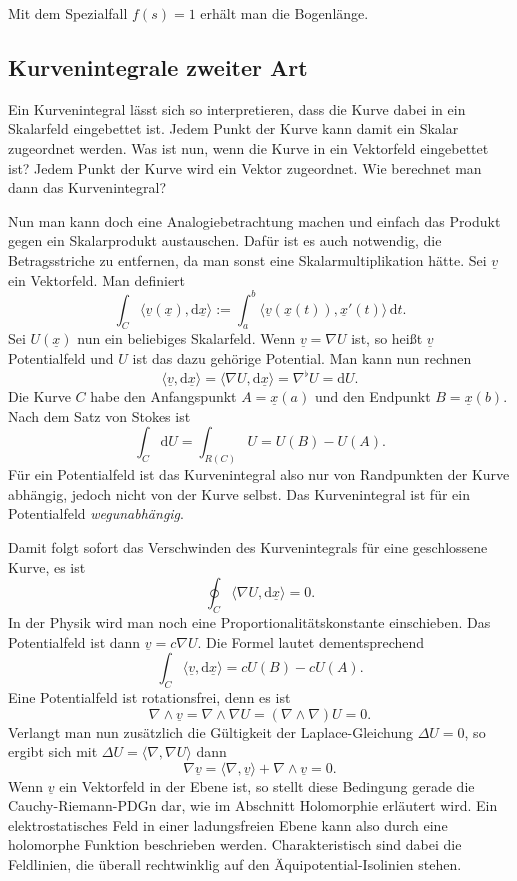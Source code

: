 \documentclass[a4paper,10pt,fleqn,twocolumn,twoside]{article}
\begin{document}
Mit dem Spezialfall $f(s)=1$ erhält
man die Bogenlänge.



\subsection{Kurvenintegrale zweiter Art}

Ein Kurvenintegral lässt sich so interpretieren, dass die Kurve
dabei in ein Skalarfeld eingebettet ist. Jedem Punkt der Kurve
kann damit ein Skalar zugeordnet werden. Was ist nun, wenn die
Kurve in ein Vektorfeld eingebettet ist? Jedem Punkt der Kurve
wird ein Vektor zugeordnet. Wie berechnet man dann das Kurvenintegral?

Nun man kann doch eine Analogiebetrachtung machen und einfach das
Produkt gegen ein Skalarprodukt austauschen. Dafür ist es auch
notwendig, die Betragsstriche zu entfernen, da man sonst eine
Skalarmultiplikation hätte. Sei $\underline v$ ein Vektorfeld.
Man definiert
\[\int_C \langle\underline v(\underline x),\mathrm d\underline x\rangle
:= \int_{a}^{b} \langle\underline v(\underline x(t)),
\underline x'(t)\rangle\,\mathrm dt.\]
Sei $U(\underline x)$ nun ein beliebiges Skalarfeld. Wenn
$\underline v=\nabla U$ ist, so heißt $\underline v$ Potentialfeld
und $U$ ist das dazu gehörige Potential. Man kann nun rechnen
\[\langle\underline v,\mathrm d\underline x\rangle
= \langle\nabla U,\mathrm d\underline x\rangle
= \nabla^\flat U
= \mathrm dU.\]
Die Kurve $C$ habe den Anfangspunkt $A=\underline x(a)$ und den
Endpunkt $B=\underline x(b)$. Nach dem Satz von Stokes ist
\[\int_C \mathrm dU = \int_{R(C)} U = U(B)-U(A).\]
Für ein Potentialfeld ist das Kurvenintegral also nur von Randpunkten
der Kurve abhängig, jedoch nicht von der Kurve selbst. Das Kurvenintegral
ist für ein Potentialfeld \textit{wegunabhängig}.

Damit folgt sofort das Verschwinden des Kurvenintegrals für eine
geschlossene Kurve, es ist
\[\oint_C \langle\nabla U,\mathrm d\underline x\rangle = 0.\]
In der Physik wird man noch eine Proportionalitätskonstante einschieben.
Das Potentialfeld ist dann $\underline v=c\nabla U$.
Die Formel lautet dementsprechend
\[\int_C \langle\underline v,\mathrm d\underline x\rangle
= cU(B)-cU(A).\]
Eine Potentialfeld ist rotationsfrei, denn es ist
\[\nabla\wedge\underline v = \nabla\wedge \nabla U
= (\nabla\wedge\nabla)U = 0.\]
Verlangt man nun zusätzlich die Gültigkeit der Laplace-Gleichung
$\Delta U = 0$, so ergibt sich mit
$\Delta U = \langle\nabla,\nabla U\rangle$ dann
\[\nabla\underline v
= \langle\nabla,\underline v\rangle + \nabla\wedge\underline v=0.\]
Wenn $\underline v$ ein Vektorfeld in der Ebene ist, so
stellt diese Bedingung gerade die Cauchy-Riemann-PDGn dar, wie
im Abschnitt Holomorphie erläutert wird. Ein elektrostatisches
Feld in einer ladungsfreien Ebene kann also durch eine holomorphe
Funktion beschrieben werden. Charakteristisch sind dabei die
Feldlinien, die überall rechtwinklig auf den Äquipotential-Isolinien
stehen.
\end{document}
